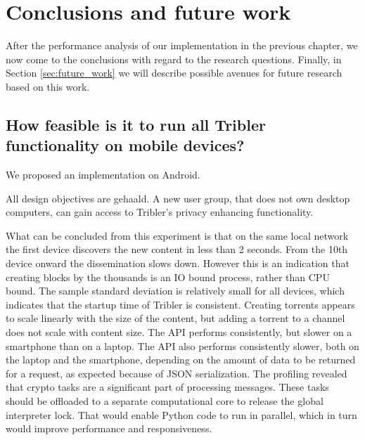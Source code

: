 \chapter{Conclusions and future work}\label{ch:conclusions}
After the performance analysis of our implementation in the previous chapter, we now come to the conclusions with regard to the research questions.
Finally, in Section \ref{sec:future_work} we will describe possible avenues for future research based on this work.


\section{How feasible is it to run all Tribler functionality on mobile devices?} %
We proposed an implementation on Android.




All design objectives are gehaald.
A new user group, that does not own desktop computers, can gain access to Tribler's privacy enhancing functionality.




What can be concluded from this experiment is that on the same local network the first device discovers the new content in less than 2 seconds.
From the 10th device onward the dissemination slows down.
However this is an indication that creating blocks by the thousands is an IO bound process, rather than CPU bound.
The sample standard deviation is relatively small for all devices, which indicates that the startup time of Tribler is consistent.
Creating torrents appears to scale linearly with the size of the content, but adding a torrent to a channel does not scale with content size.
The API performs consistently, but slower on a smartphone than on a laptop.
The API also performs consistently slower, both on the laptop and the smartphone, depending on the amount of data to be returned for a request, as expected because of JSON serialization.
The profiling revealed that crypto tasks are a significant part of processing messages.
These tasks should be offloaded to a separate computational core to release the global interpreter lock.
That would enable Python code to run in parallel, which in turn would improve performance and responsiveness.





